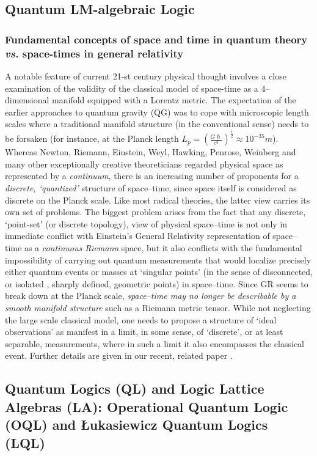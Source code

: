 \documentclass[12pt]{article}
\theoremstyle{plain}
\theoremstyle{definition}
\theoremstyle{plain}
\numberwithin{equation}{section}
\begin{document}
\subsection{Quantum LM-algebraic Logic} 

\subsubsection{Fundamental concepts of space and time in quantum theory \emph{vs.} space-times in general relativity}
 
A notable feature of current 21-st century physical thought involves a close examination of the validity of the classical model of space-time as a $4$--dimensional manifold equipped with a Lorentz metric. The expectation of the earlier approaches to quantum gravity (QG) was to cope with microscopic length scales where a traditional manifold structure (in the conventional sense) needs to be forsaken (for instance, at the Planck length $L_p = (\frac{G\hslash}{c^3})^{\frac{1}{2}} \approx 10^{-35}m$). Whereas Newton, Riemann, Einstein, Weyl, Hawking, Penrose,
Weinberg and many other exceptionally creative theoreticians
regarded physical space as represented by a \emph{continuum},
there is an increasing number of proponents for a \emph{discrete,
`quantized'} structure of space--time, since space itself is
considered as discrete on the Planck scale. Like most radical
theories, the latter view carries its own set of problems. The
biggest problem  arises from the fact that any discrete,
`point-set' (or discrete topology), view of physical space--time
is not only in immediate conflict with Einstein's General
Relativity representation of space--time as a \emph{continuous
Riemann} space, but it also conflicts with the fundamental
impossibility of carrying out quantum measurements that would
localize precisely either quantum events or masses at `singular points' (in
the sense of disconnected, or isolated , sharply defined,
geometric points) in space--time. Since GR seems to break down at the Planck scale,
\emph{space--time may no longer be describable by a smooth manifold
structure} such as a Riemann metric tensor. While not neglecting the large scale classical model,
one needs to propose a structure of `ideal observations' as manifest
in a limit, in some sense, of `discrete', or at least separable,
measurements, where in such a limit it also encompasses the classical event. 
Further details are given in our recent, related paper \cite{Bggb4}.

\subsection{Quantum Logics (QL) and Logic Lattice Algebras (LA): 
Operational Quantum Logic (OQL) and \L{}ukasiewicz Quantum Logics (LQL)}
\end{document}
